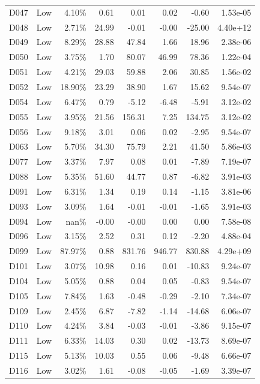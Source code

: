 \begin{tabular}{l l r r r r r r}
D047 & Low & 4.10\% & 0.61 & 0.01 & 0.02 & -0.60 & 1.53e-05 \\
D048 & Low & 2.71\% & 24.99 & -0.01 & -0.00 & -25.00 & 4.40e+12 \\
D049 & Low & 8.29\% & 28.88 & 47.84 & 1.66 & 18.96 & 2.38e-06 \\
D050 & Low & 3.75\% & 1.70 & 80.07 & 46.99 & 78.36 & 1.22e-04 \\
D051 & Low & 4.21\% & 29.03 & 59.88 & 2.06 & 30.85 & 1.56e-02 \\
D052 & Low & 18.90\% & 23.29 & 38.90 & 1.67 & 15.62 & 9.54e-07 \\
D054 & Low & 6.47\% & 0.79 & -5.12 & -6.48 & -5.91 & 3.12e-02 \\
D055 & Low & 3.95\% & 21.56 & 156.31 & 7.25 & 134.75 & 3.12e-02 \\
D056 & Low & 9.18\% & 3.01 & 0.06 & 0.02 & -2.95 & 9.54e-07 \\
D063 & Low & 5.70\% & 34.30 & 75.79 & 2.21 & 41.50 & 5.86e-03 \\
D077 & Low & 3.37\% & 7.97 & 0.08 & 0.01 & -7.89 & 7.19e-07 \\
D088 & Low & 5.35\% & 51.60 & 44.77 & 0.87 & -6.82 & 3.91e-03 \\
D091 & Low & 6.31\% & 1.34 & 0.19 & 0.14 & -1.15 & 3.81e-06 \\
D093 & Low & 3.09\% & 1.64 & -0.01 & -0.01 & -1.65 & 3.91e-03 \\
D094 & Low & nan\% & -0.00 & -0.00 & 0.00 & 0.00 & 7.58e-08 \\
D096 & Low & 3.15\% & 2.52 & 0.31 & 0.12 & -2.20 & 4.88e-04 \\
D099 & Low & 87.97\% & 0.88 & 831.76 & 946.77 & 830.88 & 4.29e+09 \\
D101 & Low & 3.07\% & 10.98 & 0.16 & 0.01 & -10.83 & 9.24e-07 \\
D104 & Low & 5.05\% & 0.88 & 0.04 & 0.05 & -0.83 & 9.54e-07 \\
D105 & Low & 7.84\% & 1.63 & -0.48 & -0.29 & -2.10 & 7.34e-07 \\
D109 & Low & 2.45\% & 6.87 & -7.82 & -1.14 & -14.68 & 6.06e-07 \\
D110 & Low & 4.24\% & 3.84 & -0.03 & -0.01 & -3.86 & 9.15e-07 \\
D111 & Low & 6.33\% & 14.03 & 0.30 & 0.02 & -13.73 & 8.69e-07 \\
D115 & Low & 5.13\% & 10.03 & 0.55 & 0.06 & -9.48 & 6.66e-07 \\
D116 & Low & 3.02\% & 1.61 & -0.08 & -0.05 & -1.69 & 3.39e-07 \\

\end{tabular}
